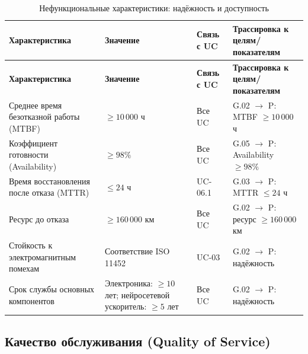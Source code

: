 \documentclass[14pt, a4paper]{extarticle}
\begin{document}
				\begin{xltabular}{\textwidth}{|L|L|L|L|}
					\caption{Нефункциональные характеристики: надёжность и доступность}\label{tab:nfr-reliability}\\
					\hline
					\textbf{Характеристика} & \textbf{Значение} & \textbf{Связь с UC} & \textbf{Трассировка к целям/показателям} \\
					\hline
					\endfirsthead
					\hline
					\textbf{Характеристика} & \textbf{Значение} & \textbf{Связь с UC} & \textbf{Трассировка к целям/показателям} \\
					\hline
					\endhead
					\hline
					\endfoot
					\hline
					\endlastfoot
					Среднее время безотказной работы (MTBF) & \(\geq 10\,000\) ч & Все UC & G.02 \(\to\) P: MTBF \(\geq 10\,000\) ч \\
					\hline
					Коэффициент готовности (Availability) & \(\geq 98\%\) & Все UC & G.05 \(\to\) P: Availability \(\geq 98\%\) \\
					\hline
					Время восстановления после отказа (MTTR) & \(\leq 24\) ч & UC-06.1 & G.03 \(\to\) P: MTTR \(\leq 24\) ч \\
					\hline
					Ресурс до отказа & \(\geq 160\,000\) км & Все UC & G.02 \(\to\) P: ресурс \(\geq 160\,000\) км \\
					\hline
					Стойкость к электромагнитным помехам & Соответствие ISO 11452 & UC-03 & G.02 \(\to\) P: надёжность \\
					\hline
					Срок службы основных компонентов & Электроника: \(\geq 10\) лет; нейросетевой ускоритель: \(\geq 5\) лет & Все UC & G.02 \(\to\) P: надёжность \\
					\hline
				\end{xltabular}
				
				\subsection{Качество обслуживания (Quality of Service)}
				
\end{document}
